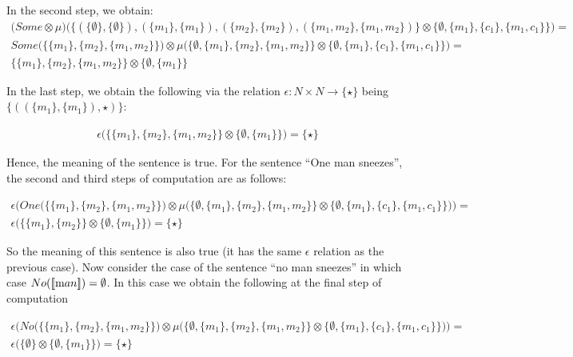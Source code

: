 \noindent
In the second step, we obtain:
\begin{align*}
\Big(Some \otimes \mu\Big) \Big ( \{(\{\emptyset\}, \{\emptyset\}), (\{m_1\}, \{m_1\}), (\{m_2\}, \{m_2\}), (\{m_1, m_2\}, \{m_1, m_2\}) \} \otimes  \{\emptyset, \{m_1\}, \{c_1\}, \{m_1, c_1\}\}  \Big) =&\\
Some\Big ( \{\{m_1\}, \{m_2\}, \{m_1, m_2\}\} \Big) \otimes \mu \Big( \{\emptyset, \{m_1\}, \{m_2\}, \{m_1, m_2\}\}  \otimes \{\emptyset, \{m_1\}, \{c_1\}, \{m_1, c_1\}\} \Big)=&\\
\{\{m_1\}, \{m_2\}, \{m_1, m_2\}\}  \otimes \{\emptyset, \{m_1\}\}
\end{align*}

\noindent
In the last step, we obtain the following via the  relation $\epsilon \colon N \times N \to \{\star\}$ being $\{((\{m_1\}, \{m_1\}), \star)\}$:

\begin{align*}
\epsilon\Big(\{\{m_1\}, \{m_2\}, \{m_1, m_2\}\}  \otimes \{\emptyset, \{m_1\}\}\Big) = \{\star\}
\end{align*}

\noindent
Hence, the meaning of the sentence is true.  For the sentence ``One man sneezes'',  the second and third steps of computation are as follows:

\begin{align*}
\epsilon\Big( One\Big ( \{\{m_1\}, \{m_2\}, \{m_1, m_2\}\} \Big) \otimes \mu \Big( \{\emptyset, \{m_1\}, \{m_2\}, \{m_1, m_2\}\}  \otimes \{\emptyset, \{m_1\}, \{c_1\}, \{m_1, c_1\}\} \Big)\Big) =&\\
\epsilon \Big(\{\{m_1\}, \{m_2\}\}  \otimes \{\emptyset, \{m_1\}\}\Big) = \{\star\}
\end{align*}

\noindent
So the meaning of this sentence is also true (it has the same $\epsilon$ relation as the previous case). Now consider the case of the  sentence ``no man sneezes'' in which case $No ([\![ \text man ]\!]) = \emptyset$. In this case we obtain  the following at the final step of computation

\begin{align*}
\epsilon\Big( No\Big ( \{\{m_1\}, \{m_2\}, \{m_1, m_2\}\} \Big) \otimes \mu \Big( \{\emptyset, \{m_1\}, \{m_2\}, \{m_1, m_2\}\}  \otimes \{\emptyset, \{m_1\}, \{c_1\}, \{m_1, c_1\}\} \Big)\Big) =&\\
\epsilon \Big(\{\emptyset\}  \otimes \{\emptyset, \{m_1\}\}\Big) = \{\star\}
\end{align*}

